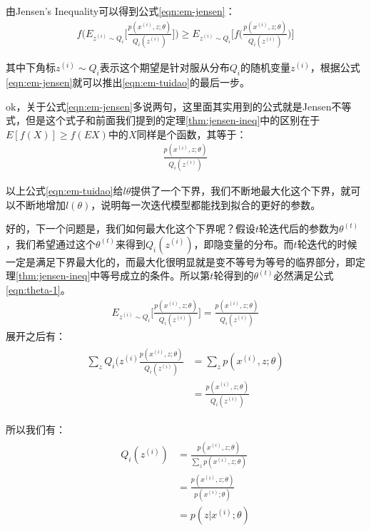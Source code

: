 由Jensen's Inequality可以得到公式\ref{eqn:em-jensen}：
\begin{align}
\label{eqn:em-jensen}
f\Bigg(E_{z^{(i)}\sim Q_{i}}\Big [\frac{p(x^{(i)}, z;\theta)}{Q_{i}(z^{(i)})}\Big ]\Bigg) \geq  E_{z^{(i)}\sim Q_{i}}\Bigg [f\Big(\frac{p(x^{(i)}, z;\theta)}{Q_{i}(z^{(i)})}\Big)\Bigg ]
\end{align}

其中下角标${z^{(i)}\sim Q_{i}}$表示这个期望是针对服从分布$Q_{i}$的随机变量$z^{(i)}$，根据公式\ref{eqn:em-jensen}就可以推出\ref{eqn:em-tuidao}的最后一步。

ok，关于公式\ref{eqn:em-jensen}多说两句，这里面其实用到的公式就是Jensen不等式，但是这个式子和前面我们提到的定理\ref{thm:jensen-ineq}中的区别在于$E[f(X)] \geq f(EX)$中的$X$同样是个函数，其等于：
\begin{align}\nonumber
\label{eqn:em-expe1}
\frac{p(x^{(i)}, z;\theta)}{Q_{i}(z^{(i)})}
\end{align}

以上公式\ref{eqn:em-tuidao}给$l{\theta}$提供了一个下界，我们不断地最大化这个下界，就可以不断地增加$l(\theta)$，说明每一次迭代模型都能找到拟合的更好的参数。

好的，下一个问题是，我们如何最大化这个下界呢？假设$t$轮迭代后的参数为$\theta^{(t)}$，我们希望通过这个$\theta^{(t)}$来得到$Q_{i}(z^{(i)})$，即隐变量的分布。而$t$轮迭代的时候一定是满足下界最大化的，而最大化很明显就是变不等号为等号的临界部分，即定理\ref{thm:jensen-ineq}中等号成立的条件。所以第$t$轮得到的$\theta^{(t)}$必然满足公式\ref{eqn:theta-1}。
\begin{align}
\label{eqn:theta-1}
E_{z^{(i)}\sim Q_{i}}\Big [\frac{p(x^{(i)}, z;\theta)}{Q_{i}(z^{(i)})}\Big ] = \frac{p(x^{(i)}, z;\theta)}{Q_{i}(z^{(i)})}
\end{align}
展开之后有：
\begin{align}
\label{eqn:theta-2}
\begin{split}
\sum_{z} Q_{i}(z^{(i)} \frac{p(x^{(i)}, z;\theta)}{Q_{i}(z^{(i)})}
    &= \sum_{z} p(x^{(i)}, z;\theta) \\
    &= \frac{p(x^{(i)}, z;\theta)}{Q_{i}(z^{(i)})}
\end{split}
\end{align}

所以我们有：
\begin{align}
\label{eqn:theta-2}
\begin{split}
  Q_{i}(z^{(i)}) &= \frac{p(x^{(i)}, z;\theta)}{\sum_{z} p(x^{(i)}, z;\theta)} \\
                 &= \frac{p(x^{(i)}, z;\theta)}{p(x^{(i)} ;\theta)} \\
                 &= p(z | x^{(i)};\theta)
\end{split}
\end{align}

